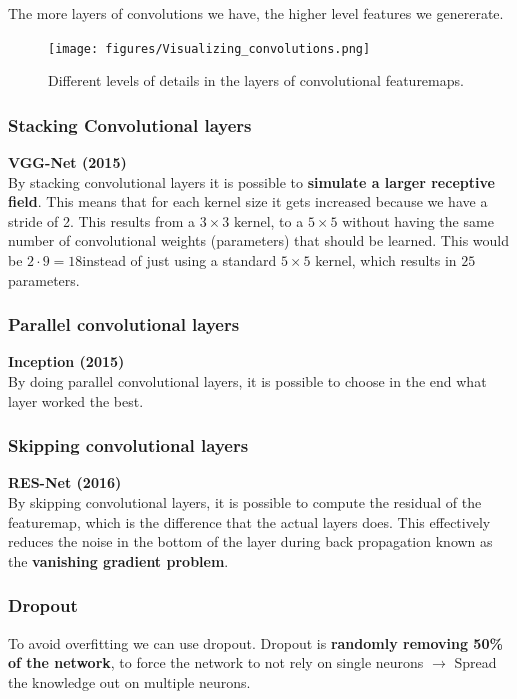 \documentclass[a4paper]{article}
\begin{document}
The more layers of convolutions we have, the higher level features we genererate.
\begin{figure}[H]
\centering
\texttt{[image: figures/Visualizing\_convolutions.png]}
\caption{Different levels of details in the layers of convolutional featuremaps.}
\label{fig:visualizing_convolutions}
\end{figure} 



\subsubsection*{Stacking Convolutional layers}
\textbf{VGG-Net (2015)}\\ 
By stacking convolutional layers it is possible to \textbf{simulate a larger receptive field}. This means that for each kernel size it gets increased because we have a stride of 2. This results from a $ 3 \times 3 $ kernel, to a $ 5 \times 5 $ without having the same number of convolutional weights (parameters) that should be learned. This would be $ 2 \cdot 9 = 18 $instead of just using a standard $ 5 \times 5 $ kernel, which results in $ 25 $ parameters. 


\subsubsection*{Parallel convolutional layers}
\textbf{Inception (2015)}\\ 
By doing parallel convolutional layers, it is possible to choose in the end what layer worked the best. 

\subsubsection*{Skipping convolutional layers}
\textbf{RES-Net (2016)}\\ 
By skipping convolutional layers, it is possible to compute the residual of the featuremap, which is the difference that the actual layers does. This effectively reduces the noise in the bottom of the layer during back propagation known as the  \textbf{vanishing gradient problem}. 


\subsubsection*{Dropout}
To avoid overfitting we can use dropout. Dropout is \textbf{randomly removing 50\% of the network}, to force the network to not rely on single neurons $ \rightarrow $ Spread the knowledge out on multiple neurons. 
\end{document}
